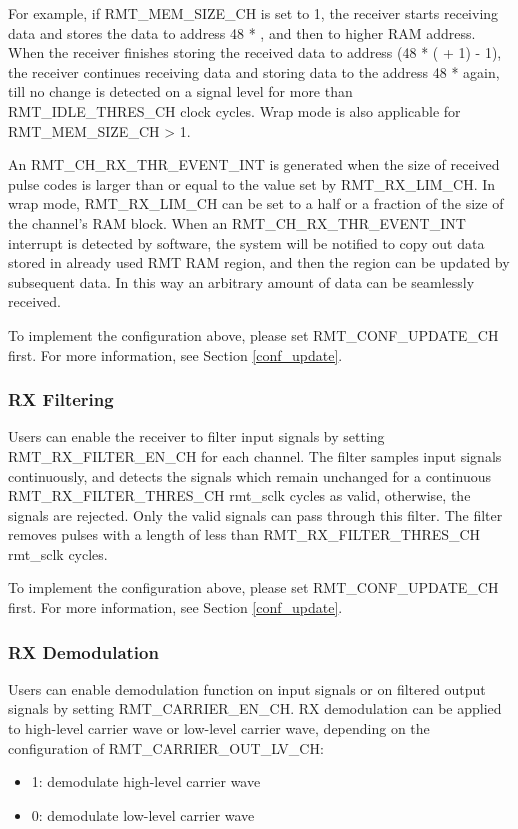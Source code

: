 \documentclass[main\_\_EN.tex]{subfiles}
\begin{document}
For example, if RMT\_MEM\_SIZE\_CH is set to 1, the receiver starts receiving data and stores the data to address 48 * , and then to higher RAM address. When the receiver finishes storing the received data to address (48 * ( + 1) - 1), the receiver continues receiving data and storing data to the address 48 *  again, till no change is detected on a signal level for more than RMT\_IDLE\_THRES\_CH clock cycles. Wrap mode is also applicable for RMT\_MEM\_SIZE\_CH > 1.

An RMT\_CH\_RX\_THR\_EVENT\_INT is generated when the size of received pulse codes is larger than or equal to the value set by RMT\_RX\_LIM\_CH. In wrap mode, RMT\_RX\_LIM\_CH
can be set to a half or a fraction of the size of the channel's RAM block. When an RMT\_CH\_RX\_THR\_EVENT\_INT interrupt is detected by software, the system will be notified to copy out data stored in already used RMT RAM region, and then the region can be updated by subsequent data. In this way an arbitrary amount of data can be seamlessly received.

To implement the configuration above, please set RMT\_CONF\_UPDATE\_CH first. For more information, see Section \ref{conf_update}.

\subsubsection{RX Filtering}

Users can enable the receiver to filter input signals by setting RMT\_RX\_FILTER\_EN\_CH for each channel. The filter samples input signals continuously, and detects the signals which remain unchanged for a continuous RMT\_RX\_FILTER\_THRES\_CH rmt\_sclk cycles as valid, otherwise, the signals are rejected. Only the valid signals can pass through this filter. The filter removes pulses with a length of less than RMT\_RX\_FILTER\_THRES\_CH rmt\_sclk cycles.

To implement the configuration above, please set RMT\_CONF\_UPDATE\_CH first. For more information, see Section \ref{conf_update}.

\subsubsection{RX Demodulation}

Users can enable demodulation function on input signals or on filtered output signals by setting RMT\_CARRIER\_EN\_CH. RX demodulation can be applied to high-level carrier wave or low-level carrier wave, depending on the configuration of RMT\_CARRIER\_OUT\_LV\_CH: 
\begin{itemize}
    \item 1: demodulate high-level carrier wave
    \item 0: demodulate low-level carrier wave
\end{itemize}
\end{document}
